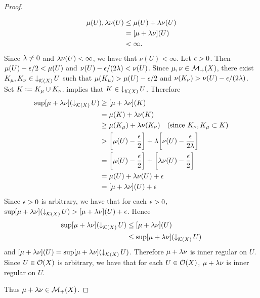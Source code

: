 \documentclass{book}
\begin{document}
\begin{proof}
\begin{enumerate}
\begin{itemize}
\begin{itemize}
					\begin{align*}
							\mu(U), \lambda \nu(U)
							& \leq \mu(U) + \lambda \nu(U) \\
							& = [\mu + \lambda \nu](U) \\
							& < \infty.
						\end{align*}
						Since $\lambda \neq 0$ and $\lambda \nu(U) < \infty$, we have that $\nu(U) < \infty$. Let $\epsilon > 0$. Then $\mu(U) - \epsilon/2 < \mu(U)$ and $\nu(U) - \epsilon/(2 \lambda) < \nu(U)$. Since $\mu, \nu \in \mathcal{M}_+(X)$, there exist $K_{\mu}, K_{\nu} \in \operatorname{\downarrow}_{\mathcal{K}(X)} U$ such that $\mu(K_{\mu}) > \mu(U) - \epsilon/2$ and $\nu(K_{\nu}) > \nu(U) - \epsilon/(2 \lambda)$. Set $K \vcentcolon= K_{\mu} \cup K_{\nu}$.  implies that $K \in \operatorname{\downarrow}_{\mathcal{K}(X)} U$. Therefore
					\begin{align*}
						\sup [\mu + \lambda \nu] (\operatorname{\downarrow}_{\mathcal{K}(X)} U)
						& \geq [\mu + \lambda \nu](K) \\
						& = \mu(K) + \lambda \nu (K) \\
						& \geq \mu(K_{\mu}) + \lambda \nu(K_{\nu}) \quad \text{(since $K_{\nu}, K_{\mu} \subset K$)} \\
						& > \bigg[  \mu(U) - \frac{\epsilon}{2} \bigg] + \lambda \bigg[ \nu(U) - \frac{\epsilon}{2 \lambda }\bigg] \\
						& = \bigg[  \mu(U) - \frac{\epsilon}{2} \bigg] + \bigg[  \lambda \nu(U) - \frac{\epsilon}{2} \bigg] \\
						& = \mu(U) + \lambda \nu(U) + \epsilon \\
						& = [\mu + \lambda \nu](U) + \epsilon  
					\end{align*}
					Since $\epsilon > 0$ is arbitrary, we have that for each $\epsilon > 0$, $\sup [\mu + \lambda \nu] (\operatorname{\downarrow}_{\mathcal{K}(X)} U) > [\mu + \lambda \nu](U) + \epsilon$. Hence 
					\begin{align*}
						\sup [\mu + \lambda \nu] (\operatorname{\downarrow}_{\mathcal{K}(X)} U)
						& \leq [\mu + \lambda \nu](U) \\
						& \leq \sup [\mu + \lambda \nu] (\operatorname{\downarrow}_{\mathcal{K}(X)} U)
					\end{align*}
					and $[\mu + \lambda \nu](U) = \sup [\mu + \lambda \nu] (\operatorname{\downarrow}_{\mathcal{K}(X)} U)$. Therefore $\mu + \lambda \nu$ is inner regular on $U$. Since $U \in \mathcal{O}(X)$ is arbitrary, we have that for each $U \in \mathcal{O}(X)$, $\mu + \lambda \nu$ is inner regular on $U$. 
				\end{itemize}
			\end{itemize}
		\end{enumerate}
		Thus $\mu + \lambda \nu \in \mathcal{M}_+(X)$.
	\end{proof}
\end{document}
